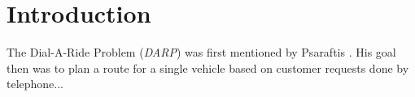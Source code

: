\chapter*{Introduction}


The Dial-A-Ride Problem (\textit{DARP}) was first mentioned by Psaraftis \cite{psaraftis1980dynamic}. His goal then was to plan a route for a single vehicle based on customer requests done by telephone...